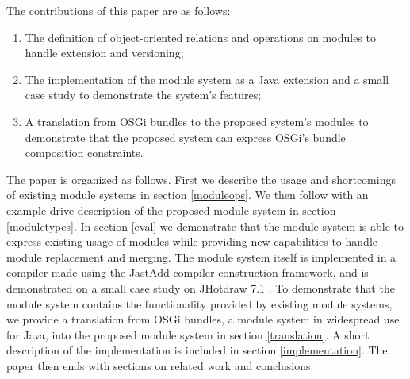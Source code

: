 




%

The contributions of this paper are as follows:

\begin{enumerate}
\item  The definition of object-oriented relations and operations on modules to 
handle extension and versioning;
\item The implementation of the module system as a Java extension and a
small case study to demonstrate the system's features;
\item A translation from OSGi bundles to the proposed system's modules to
demonstrate that the proposed system can express OSGi's bundle composition constraints.
\end{enumerate}

The paper is organized as follows. First we describe the
usage and shortcomings of existing module systems in section \ref{moduleops}. 
We then follow with an example-drive description of the proposed module system in section \ref{moduletypes}. 
In section \ref{eval} we demonstrate that the module
system is able to express existing usage of modules while providing new
capabilities to handle module replacement and merging. The module system
itself is implemented in a compiler made using the JastAdd\cite{jastadd} compiler construction
framework, and is demonstrated on a small case study on JHotdraw 7.1 \cite{jhotdraw}.
To demonstrate that the module system contains the functionality provided by existing
module systems, we provide a translation from OSGi bundles, a module system in widespread
use for Java, into the proposed module system in section \ref{translation}.
A short description of the implementation is included in section \ref{implementation}.
The paper then ends with sections on related work and conclusions.
